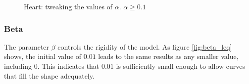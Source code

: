 \begin{figure}[!hbt]
\centering   
{}
\caption{Heart: tweaking the values of $ \alpha $. $\alpha \geq 0.1$}
\label{fig:alpha_geq}
\end{figure}

\subsubsection{Beta}

The parameter $\beta$ controls the rigidity of the model. As figure \ref{fig:beta_leq} shows, the initial value of $0.01$ leads to the same results as any smaller value, including $0$. This indicates that $0.01$ is sufficiently small enough to allow curves that fill the shape adequately.

